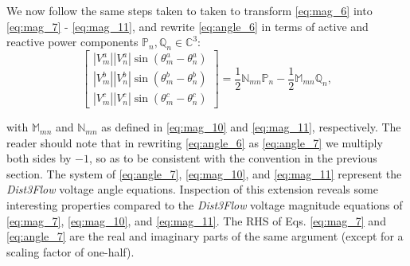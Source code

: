 We now follow the same steps taken to taken to transform \eqref{eq:mag_6} into \eqref{eq:mag_7} - \eqref{eq:mag_11}, and rewrite \eqref{eq:angle_6} in terms of active and reactive power components $\mathbb{P}_{n},\mathbb{Q}_{n} \in \mathbb C^{3}$:
\begin{equation}
	\begin{bmatrix}
		\left| V_{m}^{a} \right| \left| V_{n}^{a} \right| \sin \left( \theta_{m}^{a} - \theta_{n}^{a} \right) \\
		\left| V_{m}^{b} \right| \left| V_{n}^{b} \right| \sin \left( \theta_{m}^{b} - \theta_{n}^{b} \right) \\
		\left| V_{m}^{c} \right| \left| V_{n}^{c} \right| \sin \left( \theta_{m}^{c} - \theta_{n}^{c} \right)
	\end{bmatrix}
	=
	\frac{1}{2} \mathbb{N}_{mn} \mathbb{P}_{n} - \frac{1}{2}\mathbb{M}_{mn} \mathbb{Q}_{n},
	\label{eq:angle_7}
\end{equation}

\noindent with $\mathbb{M}_{mn}$ and $\mathbb{N}_{mn}$ as defined in \eqref{eq:mag_10} and \eqref{eq:mag_11}, respectively. The reader should note that in rewriting \eqref{eq:angle_6} as \eqref{eq:angle_7} we multiply both sides by $-1$, so as to be consistent with the convention in the previous section. The system of \eqref{eq:angle_7}, \eqref{eq:mag_10}, and \eqref{eq:mag_11} represent the \emph{Dist3Flow} voltage angle equations. Inspection of this extension reveals some interesting properties compared to the \emph{Dist3Flow} voltage magnitude equations of \eqref{eq:mag_7}, \eqref{eq:mag_10}, and \eqref{eq:mag_11}. The RHS of Eqs. \eqref{eq:mag_7} and \eqref{eq:angle_7} are the real and imaginary parts of the same argument (except for a scaling factor of one-half).

